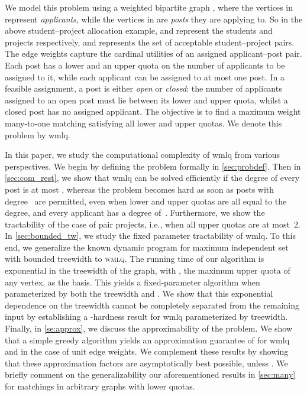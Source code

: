 \documentclass{llncs}
\begin{document}
We model this problem using a weighted bipartite graph , where the vertices in  represent \emph{applicants}, while the vertices in  are \emph{posts} they are applying to. So in the above student--project allocation example,  and  represent the students and projects respectively, and  represents the set of acceptable student--project pairs. The edge weights capture the cardinal utilities of an assigned applicant--post pair. Each post has a lower and an upper quota on the number of applicants to be assigned to it, while each applicant can be assigned to at most one post.  In a feasible assignment, a post is either \emph{open} or \emph{closed}: the number of applicants assigned to an open post must lie between its lower and upper quota, whilst a closed post has no assigned applicant. The objective is to find a maximum weight many-to-one matching satisfying all lower and upper quotas. We denote this problem by {\sc wmlq}.

In this paper, we study the computational complexity of {\sc wmlq} from various perspectives.  We begin by defining the problem formally in \cref{sec:probdef}.  Then in \cref{sec:com_rest}, we show that {\sc wmlq} can be solved efficiently if the degree of every post is at most , whereas the problem becomes hard as soon as posts with degree~ are permitted, even when lower and upper quotas are all equal to the degree, and every applicant has a degree of~. Furthermore, we show the tractability of the case of pair projects, i.e., when all upper quotas are at most~2. In \cref{sec:bounded_tw}, we study the fixed parameter tractability of {\sc wmlq}. To this end, we generalize the known dynamic program for maximum independent set with bounded treewidth to \textsc{wmlq}. The running time of our algorithm is exponential in the treewidth of the graph, with , the maximum upper quota of any vertex, as the basis. This yields a fixed-parameter algorithm when parameterized by both the treewidth and . We show that this exponential dependence on the treewidth cannot be completely separated from the remaining input by establishing a -hardness result for {\sc wmlq} parameterized by treewidth. Finally, in \cref{se:approx}, we discuss the approximability of the problem. We show that a simple greedy algorithm yields an approximation guarantee of  for {\sc wmlq} and  in the case of unit edge weights. We complement these results by showing that these approximation factors are asymptotically best possible, unless . We briefly comment on the generalizability our aforementioned results in \cref{sec:many} for matchings in arbitrary graphs with lower quotas.
\end{document}
